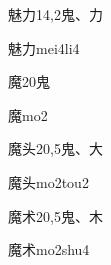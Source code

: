 \begin{Entry}{魅力}{14,2}{⿁、⼒}
  \begin{Phonetics}{魅力}{mei4li4}
  \end{Phonetics}
\end{Entry}

\begin{Entry}{魔}{20}{⿁}
  \begin{Phonetics}{魔}{mo2}
  \end{Phonetics}
\end{Entry}

\begin{Entry}{魔头}{20,5}{⿁、⼤}
  \begin{Phonetics}{魔头}{mo2tou2}
  \end{Phonetics}
\end{Entry}

\begin{Entry}{魔术}{20,5}{⿁、⽊}
  \begin{Phonetics}{魔术}{mo2shu4}
  \end{Phonetics}
\end{Entry}


